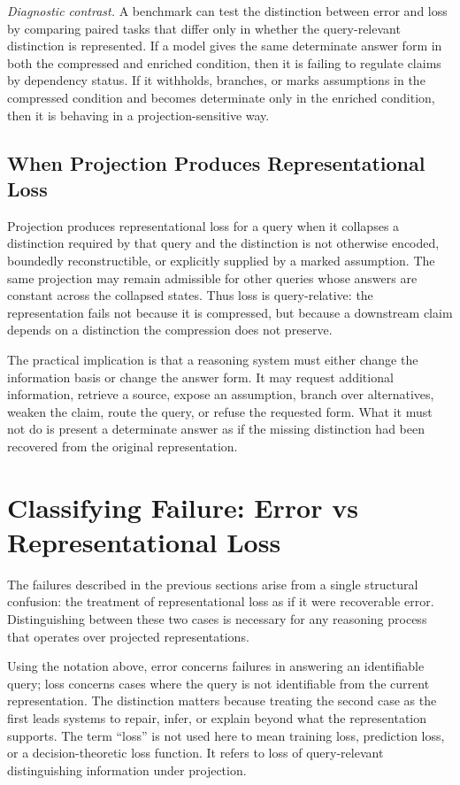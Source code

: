 \documentclass[11pt]{article}
\begin{document}
\emph{Diagnostic contrast.}
A benchmark can test the distinction between error and loss by comparing paired tasks that differ only in whether the query-relevant distinction is represented. If a model gives the same determinate answer form in both the compressed and enriched condition, then it is failing to regulate claims by dependency status. If it withholds, branches, or marks assumptions in the compressed condition and becomes determinate only in the enriched condition, then it is behaving in a projection-sensitive way.

\subsection{When Projection Produces Representational Loss}

Projection produces representational loss for a query when it collapses a distinction required by that query and the distinction is not otherwise encoded, boundedly reconstructible, or explicitly supplied by a marked assumption. The same projection may remain admissible for other queries whose answers are constant across the collapsed states. Thus loss is query-relative: the representation fails not because it is compressed, but because a downstream claim depends on a distinction the compression does not preserve.

The practical implication is that a reasoning system must either change the information basis or change the answer form. It may request additional information, retrieve a source, expose an assumption, branch over alternatives, weaken the claim, route the query, or refuse the requested form. What it must not do is present a determinate answer as if the missing distinction had been recovered from the original representation.

\section{Classifying Failure: Error vs Representational Loss}

The failures described in the previous sections arise from a single structural confusion: the treatment of representational loss as if it were recoverable error. Distinguishing between these two cases is necessary for any reasoning process that operates over projected representations.

Using the notation above, error concerns failures in answering an identifiable query; loss concerns cases where the query is not identifiable from the current representation. The distinction matters because treating the second case as the first leads systems to repair, infer, or explain beyond what the representation supports. The term ``loss'' is not used here to mean training loss, prediction loss, or a decision-theoretic loss function. It refers to loss of query-relevant distinguishing information under projection.
\end{document}
